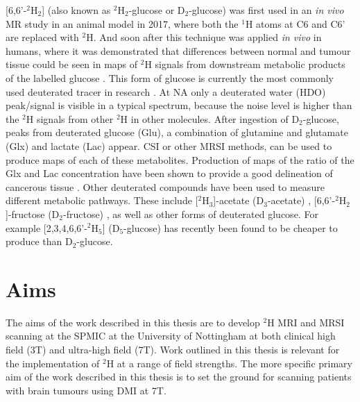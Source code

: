 [6,6'-$^2$H$_2$] (also known as $^2$H$_2$-glucose or D$_2$-glucose) was first used in an \textit{in vivo} MR study in an animal model \cite{Lu2017QuantitativeSpectroscopy} in 2017, where both the $^1$H atoms at C6 and C6' are replaced with $^2$H. And soon after this technique was applied \textit{in vivo} in humans, where it was demonstrated that differences between normal and tumour tissue could be seen in maps of $^2$H signals from downstream metabolic products of the labelled glucose \cite{DeFeyter2018DeuteriumVivo}. This form of glucose is currently the most commonly used deuterated tracer in research \cite{DeFeyter2018DeuteriumVivo,DeFeyter2021DeuteriumFuture,Ruhm2022Dynamic9.4T,Roig2022Deuterium7T,deGraaf2020OnImaging}. At \ac{NA} only a deuterated water (HDO) peak/signal is visible in a typical spectrum, because the noise level is higher than the $^2$H signals from other $^2$H in other molecules. After ingestion of D$_2$-glucose, peaks from deuterated glucose (Glu), a combination of glutamine and glutamate (Glx) and lactate (Lac) appear. \ac{CSI} or other \ac{MRSI} methods, can be used to produce maps of each of these metabolites. Production of maps of the ratio of the Glx and Lac concentration have been shown to provide a good delineation of cancerous tissue \cite{DeFeyter2018DeuteriumVivo,Straathof2021DeuteriumBrain}. Other deuterated compounds have been used to measure different metabolic pathways. These include [$^2$H$_3$]-acetate (D$_3$-acetate) \cite{DeFeyter2018DeuteriumVivo,Rich20201HVivo}, [6,6'-$^2$H$_2$]-fructose (D$_2$-fructose) \cite{Zhang202366-2H2Cancer}, as well as other forms of deuterated glucose. For example [2,3,4,6,6'-$^2$H$_5$] (D$_5$-glucose) \cite{Zou2023AImaging} has recently been found to be cheaper to produce than D$_2$-glucose.


\section{Aims}

The aims of the work described in this thesis are to develop $^2$H \ac{MRI} and \ac{MRSI} scanning at the \ac{SPMIC} at the University of Nottingham at both clinical high field (3T) and ultra-high field (7T). Work outlined in this thesis is relevant for the implementation of $^2$H at a range of field strengths. The more specific primary aim of the work described in this thesis is to set the ground for scanning patients with brain tumours using DMI at 7T.

